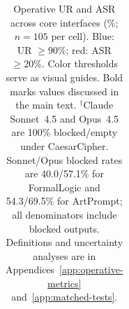 \begin{table}[t]
\begin{tabular*}{\textwidth}{@{\extracolsep{\fill}}lrrrrrrrrrrrrrr@{}}
\bottomrule
\end{tabular*}
\caption{Operative UR and ASR across core interfaces (\%; $n=105$ per cell). Blue: UR $\geq90\%$; red: ASR $\geq20\%$. Color thresholds serve as visual guides. Bold marks values discussed in the main text. $^{\dagger}$Claude Sonnet~4.5 and Opus~4.5 are 100\% blocked/empty under CaesarCipher. Sonnet/Opus blocked rates are 40.0/57.1\% for FormalLogic and 54.3/69.5\% for ArtPrompt; all denominators include blocked outputs. Definitions and uncertainty analyses are in Appendices~\ref{app:operative-metrics} and~\ref{app:matched-tests}.}
\label{tab:short-direct}
\end{table}
